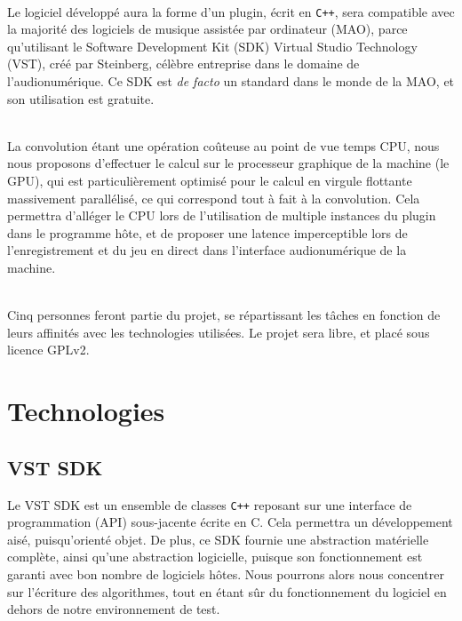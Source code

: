 ~\\
%
Le logiciel développé aura la forme d'un plugin, écrit en {\tt C++}, sera compatible avec la majorité des logiciels de musique assistée par ordinateur (MAO), parce qu'utilisant le Software Development Kit (SDK) Virtual Studio Technology (VST), créé par Steinberg, célèbre entreprise dans le domaine de l'audionumérique. Ce SDK est \emph{de facto} un standard dans le monde de la MAO, et son utilisation est gratuite.

~\\
La convolution étant une opération coûteuse au point de vue temps CPU, nous nous proposons d'effectuer le calcul sur le processeur graphique de la machine (le GPU), qui est particulièrement optimisé pour le calcul en virgule flottante massivement parallélisé, ce qui correspond tout à fait à la convolution. Cela permettra d'alléger le CPU lors de l'utilisation de multiple instances du plugin dans le programme hôte, et de proposer une latence imperceptible lors de l'enregistrement et du jeu en direct dans l'interface audionumérique de la machine.

~\\
Cinq personnes feront partie du projet, se répartissant les tâches en fonction de leurs affinités avec les technologies utilisées.
Le projet sera libre, et placé sous licence GPLv2.
\section{Technologies}
\subsection{VST SDK}
Le VST SDK est un ensemble de classes {\tt C++} reposant sur une interface de programmation (API) sous-jacente écrite en C. Cela permettra un développement aisé, puisqu'orienté objet. De plus, ce SDK fournie une abstraction matérielle complète, ainsi qu'une abstraction logicielle, puisque son fonctionnement est garanti avec bon nombre de logiciels hôtes. Nous pourrons alors nous concentrer sur l'écriture des algorithmes, tout en étant sûr du fonctionnement du logiciel en dehors de notre environnement de test.

